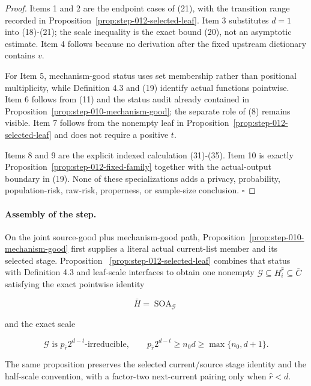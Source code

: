 \begin{proposition}
\end{proposition}

\begin{proof}
Items 1 and 2 are the endpoint cases of (21), with the
transition range recorded in
Proposition~\ref{prop:step-012-selected-leaf}. Item 3 substitutes \(d=1\)
into (18)-(21); the scale inequality is the  exact bound (20), not
an asymptotic estimate. Item 4 follows because no derivation after the
fixed upstream dictionary contains \(v\).

For Item 5,  mechanism-good status uses set membership rather than
positional multiplicity, while Definition 4.3 and (19) identify actual
functions pointwise. Item 6 follows from (11) and the status audit already
contained in Proposition~\ref{prop:step-010-mechanism-good}; the
separate role of (8) remains visible. Item 7 follows from the nonempty leaf
in Proposition~\ref{prop:step-012-selected-leaf} and does not require a
positive \(t\).

Items 8 and 9 are the explicit indexed calculation (31)-(35). Item 10 is
exactly Proposition~\ref{prop:step-012-fixed-family} together with the
actual-output boundary in (19). None of these specializations adds a
privacy, probability, population-risk, raw-risk, properness, or sample-size
conclusion. \(\square\)


\end{proof}

\paragraph{Assembly of the step.}


On the joint source-good plus mechanism-good path, Proposition~\ref{prop:step-010-mechanism-good} first supplies a literal
actual current-list member and its selected stage. Proposition
~\ref{prop:step-012-selected-leaf} combines that status with 
Definition 4.3 and leaf-scale interfaces to obtain one nonempty
\(\mathcal G\subseteq H_i^{\widehat r}\subseteq\bar C\) satisfying the
exact pointwise identity

\[
 \bar H=\operatorname{SOA}_{\mathcal G}
\]

and the exact scale

 \[
 \mathcal G\text{ is }p_{\widehat r}2^{d-t}\text{-irreducible},
 \qquad
 p_{\widehat r}2^{d-t}\ge n_0d
 \ge\max\{n_0,d+1\}.
 \]

The same proposition preserves the selected current/source stage identity
and the half-scale convention, with a factor-two next-current pairing only
when \(\widehat r<d\).

